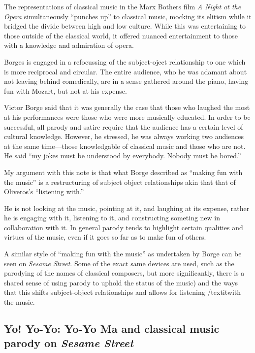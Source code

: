 \documentclass[12pt,letterpaper]{article}
\newcommand{\ses}{\textit{Sesame Street }}
\begin{document}
	The representations of classical music in the Marx Bothers film 
	\textit{A Night at the Opera} simultaneously ``punches up'' to classical
	music, mocking its elitism while it bridged the divide between high and
	low culture. While this was entertaining to those outside of the 
	classical world, it offered nuanced entertainment to those with a 
	knowledge and admiration of opera.\autocite[251]{Garrett} 


 	Borges is engaged in a refocussing of the subject-oject 
	relationship to one which is more reciprocal and circular. The entire 
	audience, who he was adamant about not leaving behind comedically, are
	in a sense gathered around the piano, having fun with Mozart, but not at
	his expense. 
	
	Victor Borge said that it was generally the case that those who laughed
	the most at his performances were those who were more musically 
	educated. In order to be successful, all parody and satire require that
	the audience has a certain level of cultural 
	knowledge.\autocite[249]{Garrett} However, he stressed, he was always 
	working two audiences at the same time---those knowledgable of classical
	music and those who are not. He said ``my jokes must be understood by 
	everybody. Nobody must be bored.''\autocite[256]{Garrett} 

	My argument with this note is that what Borge described as ``making fun	
	with the music'' is a restructuring of subject object relationships akin	that that of Oliveros's ``listening with.'' 

	He is not looking at the music, pointing at it, and laughing at its 
	expense, rather he is engaging with it, listening to it, and 
	constructing someting new in collaboration with it. In general parody 
	tends to highlight certain qualities and virtues of the music, even if 
	it goes so far as to make fun of others. 

	A similar style of ``making fun with the music'' as undertaken by 
	Borge can be seen on \textit{Sesame Street}. Some of the exact same 
	devices are used, such as the parodying of the names of classical 
	composers, but more significantly, there is a shared sense of using 
	parody to uphold the status of the music) and the ways that this shifts
	subject-object relationships and allows for listening /textit{with} the
	music.

	\subsection*{Yo! Yo-Yo: Yo-Yo Ma and classical music parody on \ses}
	

	
\newpage
\singlespacing
\printbibliography
\end{document}
